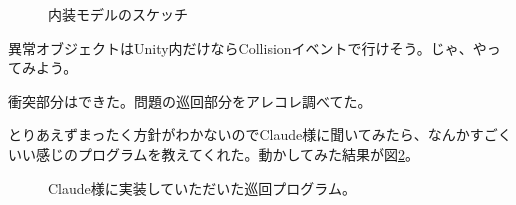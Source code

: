 \documentclass[fleqn,twocolumn]{mynote}
\begin{document}
  \fboxsep=0pt             %
  \fboxrule=1pt            %
  \begin{figure}[h]
    \centering
    \caption{内装モデルのスケッチ}
    \label{fig:interior-sketch}
  \end{figure}

  異常オブジェクトはUnity内だけならCollisionイベントで行けそう。じゃ、やってみよう。

  衝突部分はできた。問題の巡回部分をアレコレ調べてた。

  とりあえずまったく方針がわかないのでClaude様に聞いてみたら、なんかすごくいい感じのプログラムを教えてくれた。動かしてみた結果が図\ref{fig:patrol-draft}。

  \fboxsep=0pt            %
  \fboxrule=1pt            %
  \begin{figure}[h]
    \centering
    \caption{Claude様に実装していただいた巡回プログラム。}
    \label{fig:patrol-draft}
  \end{figure}
\end{document}

